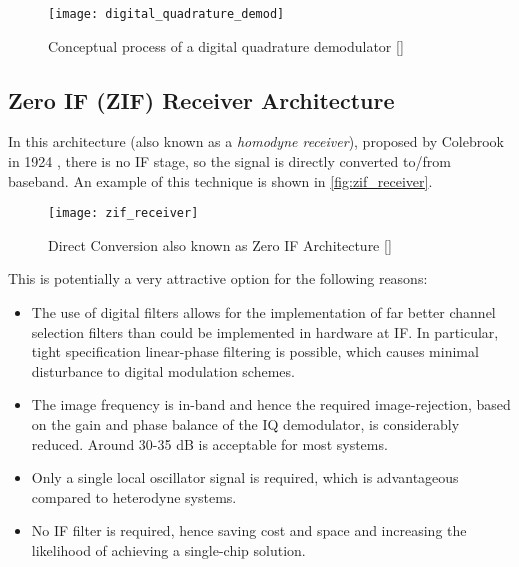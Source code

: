 \begin{figure}[ht]
  \centering
  \texttt{[image: digital\_quadrature\_demod]}
  \caption{Conceptual process of a digital quadrature demodulator [\citeauthor{rf_bb_techniques_sdr}]}
  \label{fig:digital_quadrature_demod}
\end{figure}

\subsection{Zero IF (ZIF) Receiver Architecture}
\label{sect:zif_arch}

In this architecture (also known as a \emph{homodyne receiver}), proposed by Colebrook in 1924 \cite{homodyne}, there is no IF stage, so the signal is directly converted to/from baseband. An example of this technique is shown in \autoref{fig:zif_receiver}.

\begin{figure}[H]
  \centering
  \texttt{[image: zif\_receiver]}
  \caption{Direct Conversion also known as Zero IF Architecture [\citeauthor{rf_bb_techniques_sdr}]}
  \label{fig:zif_receiver}
\end{figure}

This is potentially a very attractive option for the following reasons:
\begin{itemize}
  \item The use of digital filters allows for the implementation of far better channel selection filters than could be implemented in hardware at IF. In particular, tight specification linear-phase filtering is possible, which causes minimal disturbance to digital modulation schemes.
  \item The image frequency is in-band and hence the required image-rejection, based on the gain and phase balance of the IQ demodulator, is considerably reduced. Around 30-35 dB is acceptable for most systems.
  \item Only a single local oscillator signal is required, which is advantageous compared to heterodyne systems.
  \item No IF filter is required, hence saving cost and space and increasing the likelihood of achieving a single-chip solution.
\end{itemize}

